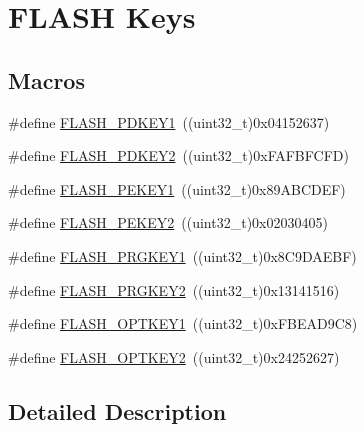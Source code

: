 \hypertarget{group___f_l_a_s_h___keys}{\section{F\-L\-A\-S\-H Keys}
\label{group___f_l_a_s_h___keys}
}
\subsection*{Macros}
\begin{DoxyCompactItemize}
\item 
\#define \hyperlink{group___f_l_a_s_h___keys_ga75e165b072d1c66e15bab68f4b5bb969}{F\-L\-A\-S\-H\-\_\-\-P\-D\-K\-E\-Y1}~((uint32\-\_\-t)0x04152637)
\item 
\#define \hyperlink{group___f_l_a_s_h___keys_ga4fac68eedf8c34c59d1953525819748d}{F\-L\-A\-S\-H\-\_\-\-P\-D\-K\-E\-Y2}~((uint32\-\_\-t)0x\-F\-A\-F\-B\-F\-C\-F\-D)
\item 
\#define \hyperlink{group___f_l_a_s_h___keys_ga50e1cb8dd47ab7b9bbe531bccb5b262b}{F\-L\-A\-S\-H\-\_\-\-P\-E\-K\-E\-Y1}~((uint32\-\_\-t)0x89\-A\-B\-C\-D\-E\-F)
\item 
\#define \hyperlink{group___f_l_a_s_h___keys_gaaa95bd33920501ae2c1c75af583aaadf}{F\-L\-A\-S\-H\-\_\-\-P\-E\-K\-E\-Y2}~((uint32\-\_\-t)0x02030405)
\item 
\#define \hyperlink{group___f_l_a_s_h___keys_ga5b5a46beaf436509b0baf958cd4160f1}{F\-L\-A\-S\-H\-\_\-\-P\-R\-G\-K\-E\-Y1}~((uint32\-\_\-t)0x8\-C9\-D\-A\-E\-B\-F)
\item 
\#define \hyperlink{group___f_l_a_s_h___keys_gac76fe21297ad4b8563ad02ddd6cda42f}{F\-L\-A\-S\-H\-\_\-\-P\-R\-G\-K\-E\-Y2}~((uint32\-\_\-t)0x13141516)
\item 
\#define \hyperlink{group___f_l_a_s_h___keys_ga1630c4f338daf2741daa1273f657164f}{F\-L\-A\-S\-H\-\_\-\-O\-P\-T\-K\-E\-Y1}~((uint32\-\_\-t)0x\-F\-B\-E\-A\-D9\-C8)
\item 
\#define \hyperlink{group___f_l_a_s_h___keys_gae0da3085d59cf73089bfb1a2b9d9367d}{F\-L\-A\-S\-H\-\_\-\-O\-P\-T\-K\-E\-Y2}~((uint32\-\_\-t)0x24252627)
\end{DoxyCompactItemize}


\subsection{Detailed Description}



